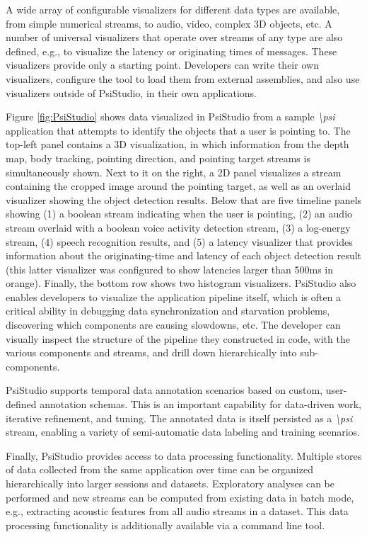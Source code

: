 \documentclass[letterpaper]{article} %
\newcommand{\psif}{\emph{\textbackslash psi} }
\begin{document}
A wide array of configurable visualizers for different data types are available, from simple numerical streams, to audio, video, complex 3D objects, etc. A number of universal visualizers that operate over streams of any type are also defined, e.g., to visualize the latency or originating times of messages. These visualizers provide only a starting point. Developers can write their own visualizers, configure the tool to load them from external assemblies, and also use visualizers outside of PsiStudio, in their own applications.

Figure \ref{fig:PsiStudio} shows data visualized in PsiStudio from a sample \psif application that attempts to identify the objects that a user is pointing to. The top-left panel contains a 3D visualization, in which information from the depth map, body tracking, pointing direction, and pointing target streams is simultaneously shown. Next to it on the right, a 2D panel visualizes a stream containing the cropped image around the pointing target, as well as an overlaid visualizer showing the object detection results. Below that are five timeline panels showing (1) a boolean stream indicating when the user is pointing, (2) an audio stream overlaid with a boolean voice activity detection stream, (3) a log-energy stream, (4) speech recognition results, and (5) a latency visualizer that provides information about the originating-time and latency of each object detection result (this latter visualizer was configured to show latencies larger than 500ms in orange). Finally, the bottom row shows two histogram visualizers. PsiStudio also enables developers to visualize the application pipeline itself, which is often a critical ability in debugging data synchronization and starvation problems, discovering which components are causing slowdowns, etc. The developer can visually inspect the structure of the pipeline they constructed in code, with the various components and streams, and drill down hierarchically into sub-components.

PsiStudio supports temporal data annotation scenarios based on custom, user-defined annotation schemas. This is an important capability for data-driven work, iterative refinement, and tuning. The annotated data is itself persisted as a \psif stream, enabling a variety of semi-automatic data labeling and training scenarios.

Finally, PsiStudio provides access to data processing functionality. Multiple stores of data collected from the same application over time can be organized hierarchically into larger sessions and datasets. Exploratory analyses can be performed and new streams can be computed from existing data in batch mode, e.g., extracting acoustic features from all audio streams in a dataset. This data processing functionality is additionally available via a command line tool.
\end{document}
